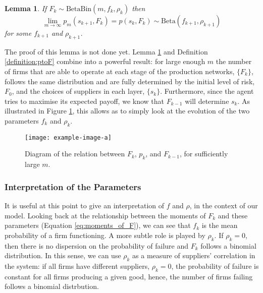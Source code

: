 \documentclass[american, abstract=on]{scrartcl}
\newcommand{\inputTikZ}[2]{%
        \scalebox{#1}{}  
      }
\theoremstyle{plain}
\newtheorem{lemma}{Lemma}
\newcommand{\Beta}{\text{Beta}}
\newcommand{\Bin}{\text{Bin}}
\begin{document}
\begin{lemma} \label{lemma:Ftop}
  If $F_k \sim \Beta\Bin(m, f_k, \rho_k)$ then \begin{equation*}\lim_{m \rightarrow \infty} p_m(s_{k + 1}, F_k) = p(s_k, F_k) \sim \Beta(f_{k + 1}, \rho_{k + 1})\end{equation*} for some $f_{k + 1}$ and $\rho_{k + 1}$.
\end{lemma}

The proof of this lemma {\color{red} is not done yet.} Lemma \ref*{lemma:Ftop} and Definition \ref*{definition:ptoF} combine into a powerful result: for large enough $m$ the number of firms that are able to operate at each stage of the production networks, $\{F_k\}$, follows the same distribution and are fully determined by the initial level of risk, $F_0$, and the choices of suppliers in each layer, $\{s_k\}$. Furthermore, since the agent tries to maximise its expected payoff, we know that $F_{k - 1}$ will determine $s_k$. As illustrated in Figure \ref*{fig:propagation-of-risk}, this allows as to simply look at the evolution of the two parameters $f_k$ and $\rho_k$.


\begin{figure}[H]
  \centering
  \texttt{[image: example-image-a]}
  \caption{Diagram of the relation between $F_k$, $p_k$, and $F_{k - 1}$, for sufficiently large $m$.}
  \label{fig:propagation-of-risk}
\end{figure}

\subsubsection{Interpretation of the Parameters}

It is useful at this point to give an interpretation of $f$ and $\rho$, in the context of our model. Looking back at the relationship between the moments of $F_k$ and these parameters (Equation \ref{eq:moments_of_F}), we can see that $f_k$ is the mean probability of a firm functioning. A more subtle role is played by $\rho_k$. If $\rho_k = 0$, then there is no dispersion on the probability of failure and $F_k$ follows a binomial distribution. In this sense, we can use $\rho_k$ as a measure of suppliers' correlation in the system: if all firms have different suppliers, $\rho_k = 0$, the probability of failure is constant for all firms producing a given good, hence, the number of firms failing follows a binomial distrbution.
\end{document}
